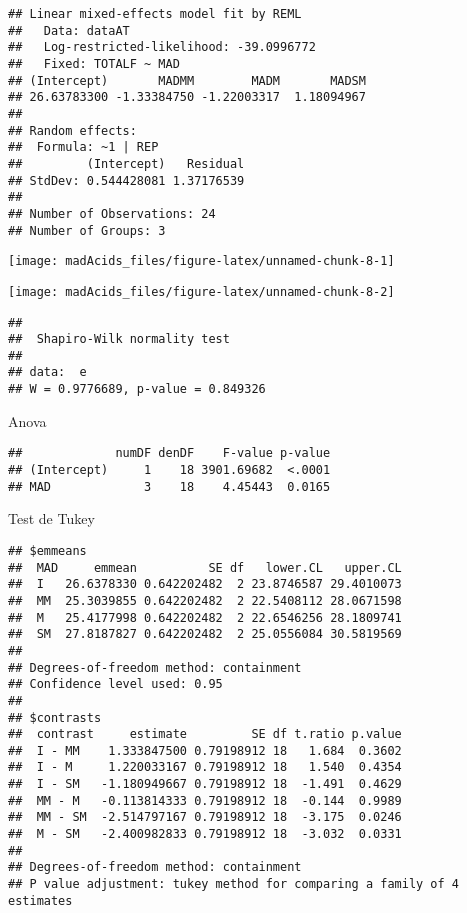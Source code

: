 \documentclass[
]{article}
\begin{document}
\begin{verbatim}
## Linear mixed-effects model fit by REML
##   Data: dataAT 
##   Log-restricted-likelihood: -39.0996772
##   Fixed: TOTALF ~ MAD 
## (Intercept)       MADMM        MADM       MADSM 
## 26.63783300 -1.33384750 -1.22003317  1.18094967 
## 
## Random effects:
##  Formula: ~1 | REP
##         (Intercept)   Residual
## StdDev: 0.544428081 1.37176539
## 
## Number of Observations: 24
## Number of Groups: 3
\end{verbatim}

\begin{center}\texttt{[image: madAcids\_files/figure-latex/unnamed-chunk-8-1]} \end{center}

\begin{center}\texttt{[image: madAcids\_files/figure-latex/unnamed-chunk-8-2]} \end{center}

\begin{verbatim}
## 
##  Shapiro-Wilk normality test
## 
## data:  e
## W = 0.9776689, p-value = 0.849326
\end{verbatim}

Anova

\begin{verbatim}
##             numDF denDF    F-value p-value
## (Intercept)     1    18 3901.69682  <.0001
## MAD             3    18    4.45443  0.0165
\end{verbatim}

Test de Tukey

\begin{verbatim}
## $emmeans
##  MAD     emmean          SE df   lower.CL   upper.CL
##  I   26.6378330 0.642202482  2 23.8746587 29.4010073
##  MM  25.3039855 0.642202482  2 22.5408112 28.0671598
##  M   25.4177998 0.642202482  2 22.6546256 28.1809741
##  SM  27.8187827 0.642202482  2 25.0556084 30.5819569
## 
## Degrees-of-freedom method: containment 
## Confidence level used: 0.95 
## 
## $contrasts
##  contrast     estimate         SE df t.ratio p.value
##  I - MM    1.333847500 0.79198912 18   1.684  0.3602
##  I - M     1.220033167 0.79198912 18   1.540  0.4354
##  I - SM   -1.180949667 0.79198912 18  -1.491  0.4629
##  MM - M   -0.113814333 0.79198912 18  -0.144  0.9989
##  MM - SM  -2.514797167 0.79198912 18  -3.175  0.0246
##  M - SM   -2.400982833 0.79198912 18  -3.032  0.0331
## 
## Degrees-of-freedom method: containment 
## P value adjustment: tukey method for comparing a family of 4 estimates
\end{verbatim}
\end{document}
